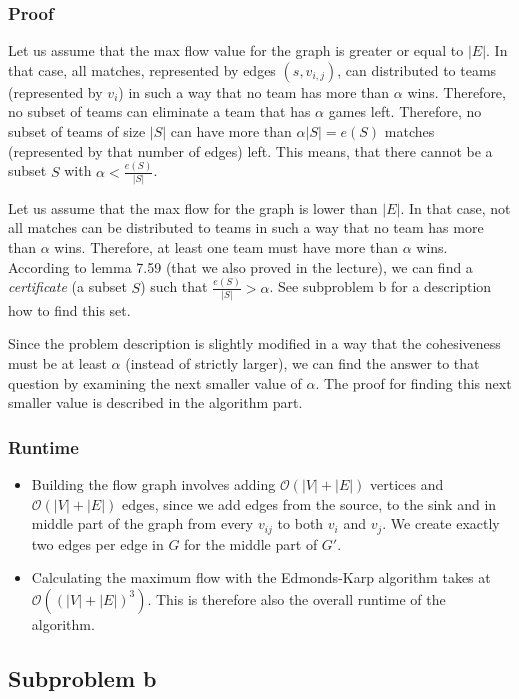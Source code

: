 \documentclass[12pt]{article}
\begin{document}
\subsubsection*{Proof}
Let us assume that the max flow value for the graph is greater or equal to $|E|$. In that case, all matches, represented by edges $(s, v_{i,j})$, can distributed to teams (represented by $v_i$) in such a way that no team has more than $\alpha$ wins. Therefore, no subset of teams can eliminate a team that has $\alpha$ games left. Therefore, no subset of teams of size $|S|$ can have more than $\alpha |S| = e(S)$ matches (represented by that number of edges) left. This means, that there cannot be a subset $S$ with $\alpha < \frac{e(S)}{|S|}$.

Let us assume that the max flow for the graph is lower than $|E|$. In that case, not all matches can be distributed to teams in such a way that no team has more than $\alpha$ wins. Therefore, at least one team must have more than $\alpha$ wins. According to lemma 7.59 (that we also proved in the lecture), we can find a \emph{certificate} (a subset $S$) such that $\frac{e(S)}{|S|} > \alpha$. See subproblem b for a description how to find this set.

Since the problem description is slightly modified in a way that the cohesiveness must be at least $\alpha$ (instead of strictly larger), we can find the answer to that question by examining the next smaller value of $\alpha$. The proof for finding this next smaller value is described in the algorithm part.

\subsubsection*{Runtime}
\begin{itemize}
	\item Building the flow graph involves adding $\mathcal{O}(|V| + |E|)$ vertices and $\mathcal{O}(|V| + |E|)$ edges, since we add edges from the source, to the sink and in middle part of the graph from every $v_{ij}$ to both $v_i$ and $v_j$. We create exactly two edges per edge in $G$ for the middle part of $G'$.
	\item Calculating the maximum flow with the Edmonds-Karp algorithm takes at $\mathcal{O}((|V| + |E|)^3)$. This is therefore also the overall runtime of the algorithm. 
\end{itemize}

\subsection*{Subproblem b}
\end{document}
